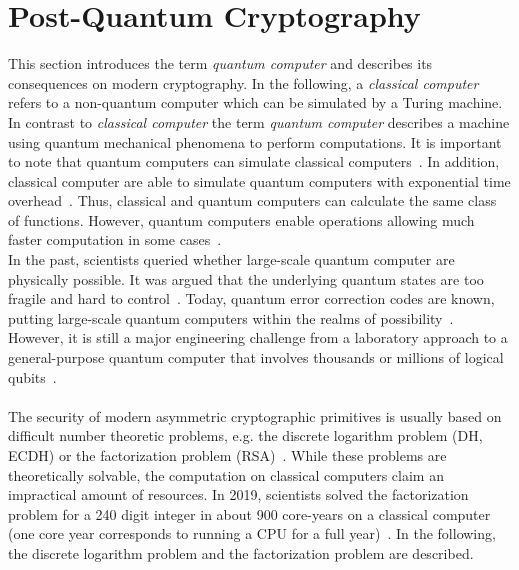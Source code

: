 \section{Post-Quantum Cryptography}
This section introduces the term \textit{quantum computer} and describes its consequences on modern cryptography. In the following, a \textit{classical computer} refers to a non-quantum computer which can be simulated by a Turing machine. In contrast to \textit{classical computer} the term \textit{quantum computer} describes a machine using quantum mechanical phenomena to perform computations. It is important to note that quantum computers can simulate classical computers~\parencite{nielsen2002quantum}. In addition, classical computer are able to simulate quantum computers with exponential time overhead~\parencite{nielsen2002quantum}. Thus, classical and quantum computers can calculate the same class of functions. However, quantum computers enable operations allowing much faster computation in some cases~\parencite{nielsen2002quantum}.\\
In the past, scientists queried whether large-scale quantum computer are physically possible. It was argued that the underlying quantum states are too fragile and hard to control~\parencite{chen2016report}. Today, quantum error correction codes are known, putting large-scale quantum computers within the realms of possibility~\parencite{lidar2013quantum}. However, it is still a major engineering challenge from a laboratory approach to a general-purpose quantum computer that involves thousands or millions of logical qubits~\parencite{chen2016report}.
\\\\
The security of modern asymmetric cryptographic primitives is usually based on difficult number theoretic problems, e.g. the discrete logarithm problem (\gls{DH}, \gls{ECDH}) or the factorization problem (\gls{RSA})~\parencite{chen2016report}. While these problems are theoretically solvable, the computation on classical computers claim an impractical amount of resources. In 2019, scientists solved the factorization problem for a 240 digit integer in about 900 core-years on a classical computer (one core year corresponds to running a CPU for a full year)~\parencite{boudot2795}. In the following, the discrete logarithm problem and the factorization problem are described.

